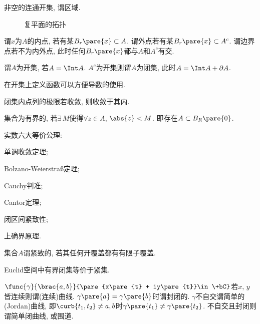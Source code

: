 \documentclass{ctexart}
\begin{document}
\begin{definition}[区域]
    非空的连通开集, 谓区域.
\end{definition}
\begin{figure}[ht]
    \centering
    \caption{复平面的拓扑}
\end{figure}
谓$x$为$A$的内点, 若有某$B_r\pare{x}\subset A$. 谓外点若有某$B_r\pare{x}\subset A^c$. 谓边界点若不为内外点, 此时任何$B_r\pare{x}$都与$A$和$A^c$有交.
\begin{definition}[开集]
    谓$A$为开集, 若$A = \Int A$. $A^c$为开集则谓$A$为闭集, 此时$A = \Int A + \partial A$.
\end{definition}
\begin{remark}
    在开集上定义函数可以方便导数的使用.
\end{remark}
\begin{remark}
    闭集内点列的极限若收敛, 则收敛于其内.
\end{remark}
\begin{definition}[有界]
    集合为有界的, 若$\exists\, M$使得$\forall z\in A$, $\abs{z} < M$. 即存在$A\subset B_R\pare{0}$.
\end{definition}
实数六大等价公理:
\begin{multicols}{2}
    \begin{cenum}
        \item 单调收敛定理;
        \item Bolzano-Weierstra\ss 定理;
        \item Cauchy判准;
        \item Cantor定理;
        \item 闭区间紧致性;
        \item 上确界原理.
    \end{cenum}
\end{multicols}
\begin{definition}[紧致性]
    集合$A$谓紧致的, 若其任何开覆盖都有有限子覆盖.
\end{definition}
\begin{theorem}
    Euclid空间中有界闭集等价于紧集.
\end{theorem}
\begin{definition}[曲线]
    $\func{\gamma}{\brac{a,b}}{\pare{x\pare{t} + iy\pare{t}}\in \+bC}$若$x$, $y$皆连续则谓(连续)曲线. $\gamma\pare{a} = \gamma\pare{b}$时谓封闭的. $\gamma$不自交谓简单的(Jordan)曲线, 即$\curb{t_1, t_2}\neq {a,b}$时$\gamma\pare{t_1}\neq \gamma\pare{t_2}$. 不自交且封闭则谓简单闭曲线, 或围道.
\end{definition}
\end{document}

